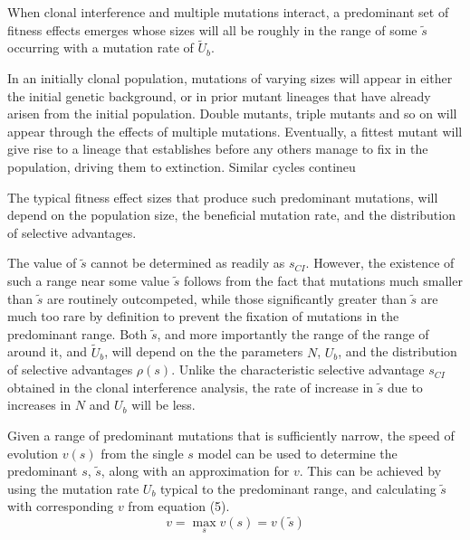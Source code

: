 \documentclass[12pt, one column]{article}
\begin{document}
When clonal interference and multiple mutations interact, a predominant set of fitness effects emerges whose sizes will all be roughly in the range of some $\tilde{s}$ occurring with a mutation rate of $\tilde{U}_b$.  


In an initially clonal population, mutations of varying sizes will appear in either the initial genetic background, or in prior mutant lineages that have already arisen from the initial population. Double mutants, triple mutants and so on will appear through the effects of multiple mutations.  Eventually, a fittest mutant will give rise to a lineage that establishes before any others manage to fix in the population, driving them to extinction.  Similar cycles contineu 


The typical fitness effect sizes that produce such predominant mutations, will depend on the population size, the beneficial mutation rate, and the distribution of selective advantages.  

The value of $\tilde{s}$ cannot be determined as readily as $s_{CI}$.  However, the existence of such a range near some value $\tilde{s}$ follows from the fact that mutations much smaller than $\tilde{s}$ are routinely outcompeted, while those significantly greater than $\tilde{s}$ are much too rare by definition to prevent the fixation of mutations in the predominant range.  Both $\tilde{s}$, and more importantly the range of the range of around it, and $\tilde{U}_b$, will depend on the the parameters $N$, $U_b$, and the distribution of selective advantages $\rho(s)$.  Unlike the characteristic selective advantage $s_{CI}$ obtained in the clonal interference analysis, the rate of increase in $\tilde{s}$ due to increases in $N$ and $U_b$ will be less.

Given a range of predominant mutations that is sufficiently narrow, the speed of evolution $v(s)$ from the single $s$ model can be used to determine the predominant $s$, $\tilde{s}$, along with an approximation for $v$.  This can be achieved by using the mutation rate $U_b$ typical to the predominant range, and calculating $\tilde{s}$ with corresponding $v$ from equation (5).
\begin{equation}
v = \max_{s} v(s)=v(\tilde{s})
\end{equation}
\end{document}
